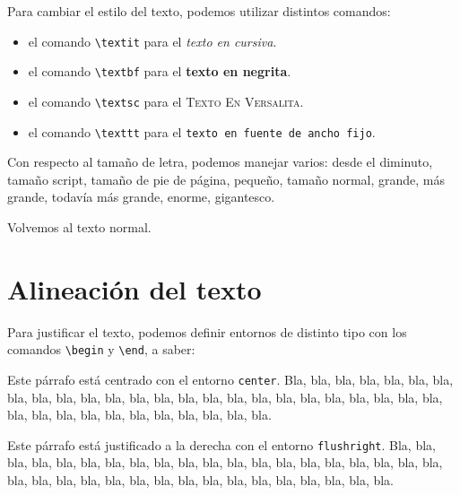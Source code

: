 \documentclass[a4paper]{article}
\begin{document}
Para cambiar el estilo del texto, podemos utilizar distintos comandos:

\begin{itemize}
\item el comando \texttt{\textbackslash textit} para el \textit{texto en cursiva}.

\item el comando \texttt{\textbackslash textbf} para el \textbf{texto en negrita}.

\item el comando \texttt{\textbackslash textsc} para el \textsc{Texto En Versalita}.

\item el comando \texttt{\textbackslash texttt} para el \texttt{texto en fuente de ancho fijo}.

\end{itemize}


Con respecto al tamaño de letra, podemos manejar varios: desde el \tiny{diminuto}, \scriptsize{tamaño script}, \footnotesize{tamaño de pie de página}, \small{pequeño}, tamaño normal, \large{grande}, \Large{más grande}, \LARGE{todavía más grande}, \huge{enorme}, \Huge{gigantesco}.

\normalsize{Volvemos al texto normal.}



\section{Alineación del texto}
\label{alineacion}

Para justificar el texto, podemos definir entornos de distinto tipo con los comandos \texttt{\textbackslash begin} y \texttt{\textbackslash end}, a saber:

\begin{center}
Este párrafo está centrado con el entorno \texttt{center}. Bla, bla, bla, bla, bla, bla, bla, bla, bla, bla, bla, bla, bla, bla, bla, bla, bla, bla, bla, bla, bla, bla, bla, bla, bla, bla, bla, bla, bla, bla, bla, bla, bla, bla, bla, bla.
\end{center}


\begin{flushright}
Este párrafo está justificado a la derecha con el entorno \texttt{flushright}. Bla, bla, bla, bla, bla, bla, bla, bla, bla, bla, bla, bla, bla, bla, bla, bla, bla, bla, bla, bla, bla, bla, bla, bla, bla, bla, bla, bla, bla, bla, bla, bla, bla, bla, bla, bla.
\end{flushright}
\end{document}
